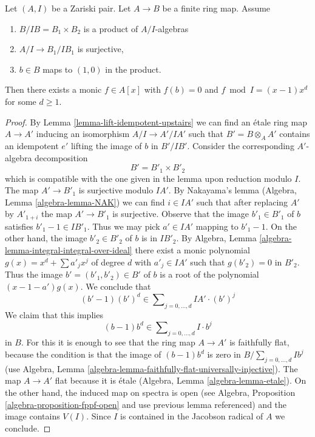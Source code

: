 \begin{lemma}
\label{lemma-helper-finite}
Let $(A, I)$ be a Zariski pair. Let $A \to B$ be a finite ring map.
Assume
\begin{enumerate}
\item $B/IB = B_1 \times B_2$ is a product of $A/I$-algebras
\item $A/I \to B_1/IB_1$ is surjective,
\item $b \in B$ maps to $(1, 0)$ in the product.
\end{enumerate}
Then there exists a monic $f \in A[x]$ with $f(b) = 0$ and
$f \bmod I = (x - 1)x^d$ for some $d \geq 1$.
\end{lemma}

\begin{proof}
By Lemma \ref{lemma-lift-idempotent-upstairs} we can find an
\'etale ring map $A \to A'$ inducing an isomorphism $A/I \to A'/IA'$
such that $B' = B \otimes_A A'$ contains
an idempotent $e'$ lifting the image of $b$ in $B'/IB'$.
Consider the corresponding $A'$-algebra decomposition
$$
B' = B'_1 \times B'_2
$$
which is compatible with the one given in the lemma upon
reduction modulo $I$.
The map $A' \to B'_1$ is surjective modulo $IA'$. By Nakayama's lemma
(Algebra, Lemma \ref{algebra-lemma-NAK})
we can find $i \in IA'$ such that after replacing $A'$
by $A'_{1 + i}$ the map $A' \to B'_1$ is surjective.
Observe that the image $b'_1 \in B'_1$ of $b$ 
satisfies $b'_1 - 1 \in IB'_1$.
Thus we may pick $a' \in IA'$ mapping to $b'_1 - 1$.
On the other hand, the image $b'_2 \in B'_2$ of $b$ is in $IB'_2$. By
Algebra, Lemma \ref{algebra-lemma-integral-integral-over-ideal}
there exist a monic polynomial
$g(x) = x^d + \sum a'_j x^j$ of degree $d$ with $a'_j \in IA'$ such that
$g(b'_2) = 0$ in $B'_2$. Thus the image $b' = (b'_1, b'_2) \in B'$
of $b$ is a root of the polynomial $(x - 1 - a')g(x)$. We conclude that
$$
(b' - 1)(b')^d \in \sum\nolimits_{j = 0, \ldots, d} IA' \cdot (b')^j
$$
We claim that this implies
$$
(b - 1)b^d \in \sum\nolimits_{j = 0, \ldots, d} I \cdot b^j
$$
in $B$. For this it is enough to see that the ring map
$A \to A'$ is faithfully flat, because the condition is that
the image of $(b - 1)b^d$ is zero in $B/\sum_{j = 0, \ldots, d} Ib^j$
(use Algebra, Lemma \ref{algebra-lemma-faithfully-flat-universally-injective}).
The map $A \to A'$ flat because it is \'etale
(Algebra, Lemma \ref{algebra-lemma-etale}).
On the other hand, the induced map on spectra is open
(see Algebra, Proposition \ref{algebra-proposition-fppf-open} and use
previous lemma referenced) and the image
contains $V(I)$. Since $I$ is contained in the Jacobson radical of $A$
we conclude.
\end{proof}
